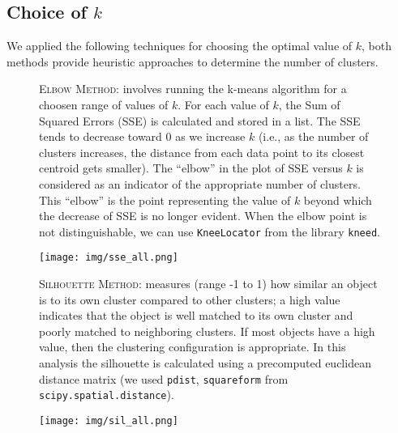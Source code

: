 \subsection{Choice of $k$}
We applied the following techniques for choosing the optimal value of $k$, both methods provide heuristic approaches to determine the number of clusters.
\begin{figure}[ht]
\begin{minipage}{.6\textwidth}
\textsc{Elbow Method}: involves running the k-means algorithm for a choosen range of values of $k$. For each value of $k$, the Sum of Squared Errors (SSE) is calculated and stored in a list. The SSE tends to decrease toward 0 as we increase $k$ (i.e., as the number of clusters increases, the distance from each data point to its closest centroid gets smaller). The “elbow” in the plot of SSE versus $k$ is considered as an indicator of the appropriate number of clusters. This “elbow” is the point representing the value of $k$ beyond which the decrease of SSE is no longer evident. When the elbow point is not distinguishable, we can use \texttt{KneeLocator} from the library \texttt{kneed}.
\end{minipage}
\begin{minipage}{.4\textwidth}
\texttt{[image: img/sse\_all.png]}
\end{minipage}
\end{figure}
\begin{figure}[ht]
\begin{minipage}{.6\textwidth}
\textsc{Silhouette Method}: measures (range -1 to 1) how similar an object is to its own cluster compared to other clusters; a high value indicates that the object is well matched to its own cluster and poorly matched to neighboring clusters. If most objects have a high value, then the clustering configuration is appropriate. In this analysis the silhouette is calculated using a precomputed euclidean distance matrix (we used \texttt{pdist}, \texttt{squareform} from \texttt{scipy.spatial.distance}).
\end{minipage}
\begin{minipage}{.4\textwidth}
\texttt{[image: img/sil\_all.png]}
\end{minipage}
\end{figure}
\newpage
